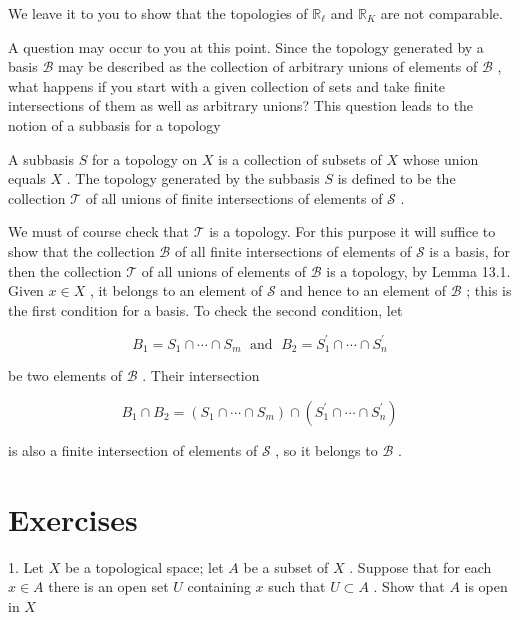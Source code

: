 We leave it to you to show that the topologies of \({\mathbb{R}}_{\ell }\) and \({\mathbb{R}}_{K}\) are not comparable.

A question may occur to you at this point. Since the topology generated by a basis \(\mathcal{B}\) may be described as the collection of arbitrary unions of elements of \(\mathcal{B}\) , what happens if you start with a given collection of sets and take finite intersections of them as well as arbitrary unions? This question leads to the notion of a subbasis for a topology

\begin{definition} A subbasis \(S\) for a topology on \(X\) is a collection of subsets of \(X\) whose union equals \(X\) . The topology generated by the subbasis \(S\) is defined to be the collection \(\mathcal{T}\) of all unions of finite intersections of elements of \(\mathcal{S}\) .
\end{definition}


We must of course check that \(\mathcal{T}\) is a topology. For this purpose it will suffice to show that the collection \(\mathcal{B}\) of all finite intersections of elements of \(\mathcal{S}\) is a basis, for then the collection \(\mathcal{T}\) of all unions of elements of \(\mathcal{B}\) is a topology, by Lemma 13.1. Given \(x \in  X\) , it belongs to an element of \(\mathcal{S}\) and hence to an element of \(\mathcal{B}\) ; this is the first condition for a basis. To check the second condition, let

\[
{B}_{1} = {S}_{1} \cap  \cdots  \cap  {S}_{m}\;\text{ and }\;{B}_{2} = {S}_{1}^{\prime } \cap  \cdots  \cap  {S}_{n}^{\prime }
\]

be two elements of \(\mathcal{B}\) . Their intersection

\[
{B}_{1} \cap  {B}_{2} = \left( {{S}_{1} \cap  \cdots  \cap  {S}_{m}}\right)  \cap  \left( {{S}_{1}^{\prime } \cap  \cdots  \cap  {S}_{n}^{\prime }}\right)
\]

is also a finite intersection of elements of \(\mathcal{S}\) , so it belongs to \(\mathcal{B}\) .

\section*{Exercises}

1. Let \(X\) be a topological space; let \(A\) be a subset of \(X\) . Suppose that for each \(x \in  A\) there is an open set \(U\) containing \(x\) such that \(U \subset  A\) . Show that \(A\) is open in \(X\)

